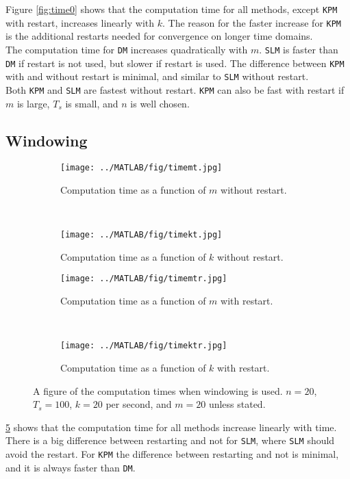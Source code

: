 \noindent Figure \ref{fig:time0} shows that the computation time for all methods, except \texttt{KPM} with restart, increases linearly with $k$. The reason for the faster increase for \texttt{KPM} is the additional restarts needed for convergence on longer time domains. \\

\noindent The computation time for \texttt{DM} increases quadratically with $m$. \texttt{SLM} is faster than \texttt{DM} if restart is not used, but slower if restart is used. The difference between \texttt{KPM} with and without restart is minimal, and similar to \texttt{SLM} without restart. \\

\noindent Both \texttt{KPM} and \texttt{SLM} are fastest without restart. \texttt{KPM} can also be fast with restart if $m$ is large, $T_s$ is small, and $n$ is well chosen.
\subsection{Windowing}
\begin{figure}[H]
        \centering
        \begin{subfigure}[b]{0.3\textwidth}
                \texttt{[image: ../MATLAB/fig/timemt.jpg]}
                \caption{ Computation time as a function of $m$ without restart. }
                \label{fig:timemt}
        \end{subfigure}
        ~
        \begin{subfigure}[b]{0.3\textwidth}
                \texttt{[image: ../MATLAB/fig/timekt.jpg]}
                \caption{ Computation time as a function of $k$ without restart. }
                \label{fig:timekt}
        \end{subfigure}

        \begin{subfigure}[b]{0.3\textwidth}
                \texttt{[image: ../MATLAB/fig/timemtr.jpg]}
                \caption{ Computation time as a function of $m$ with restart. }
                \label{fig:timemtr}
        \end{subfigure}
        ~
        \begin{subfigure}[b]{0.3\textwidth}
                \texttt{[image: ../MATLAB/fig/timektr.jpg]}
                \caption{ Computation time as a function of $k$ with restart. }
                \label{fig:timektr}
        \end{subfigure}        
        
        \caption{ A figure of the computation times when windowing is used. $n = 20$, $T_s = 100$, $k = 20$ per second, and $m = 20$ unless stated. }
        \label{fig:time2}
\end{figure}
\ref{fig:time2} shows that the computation time for all methods increase linearly with time. There is a big difference between restarting and not for \texttt{SLM}, where \texttt{SLM} should avoid the restart. For \texttt{KPM}  the difference between restarting and not is minimal, and it is always faster than \texttt{DM}. \\

